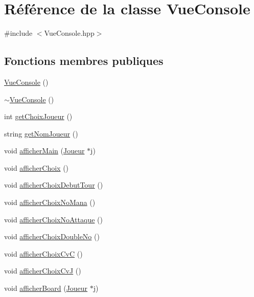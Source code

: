 \hypertarget{class_vue_console}{\section{Référence de la classe Vue\-Console}
\label{class_vue_console}
}


{\ttfamily \#include $<$Vue\-Console.\-hpp$>$}

\subsection*{Fonctions membres publiques}
\begin{DoxyCompactItemize}
\item 
\hyperlink{class_vue_console_a3fc6ba85609459d0919cf9ad4fc1056a}{Vue\-Console} ()
\item 
\hyperlink{class_vue_console_a84554327c266781a3ee5422e1dba674b}{$\sim$\-Vue\-Console} ()
\item 
int \hyperlink{class_vue_console_a8a2212cbdd27511f92f29c222957c80c}{get\-Choix\-Joueur} ()
\item 
string \hyperlink{class_vue_console_a5340da9b0a7fad73fe91b26ec6b20f3b}{get\-Nom\-Joueur} ()
\item 
void \hyperlink{class_vue_console_a0782f21077f7c1be22e798ec445a4d87}{afficher\-Main} (\hyperlink{class_joueur}{Joueur} $\ast$j)
\item 
void \hyperlink{class_vue_console_a44d91e29edaa189252dedd1ee643619d}{afficher\-Choix} ()
\item 
void \hyperlink{class_vue_console_a80c7dcfb3eb9a381b37ba46a7ac366af}{afficher\-Choix\-Debut\-Tour} ()
\item 
void \hyperlink{class_vue_console_aeda02f293126db8b72755d223fe2b0e0}{afficher\-Choix\-No\-Mana} ()
\item 
void \hyperlink{class_vue_console_a52c6059b31bcca4000d94fd2578363b8}{afficher\-Choix\-No\-Attaque} ()
\item 
void \hyperlink{class_vue_console_af38fecfa458f233e81f2beeda1610ec3}{afficher\-Choix\-Double\-No} ()
\item 
void \hyperlink{class_vue_console_a12e8a5246c04cd6ba39fdb29c6b3765a}{afficher\-Choix\-Cv\-C} ()
\item 
void \hyperlink{class_vue_console_ad5941f80c25dd4252db2f803cc9ad7e3}{afficher\-Choix\-Cv\-J} ()
\item 
void \hyperlink{class_vue_console_a956e2949c9c9b1485eb734ba20affcf4}{afficher\-Board} (\hyperlink{class_joueur}{Joueur} $\ast$j)

\end{DoxyCompactItemize}
